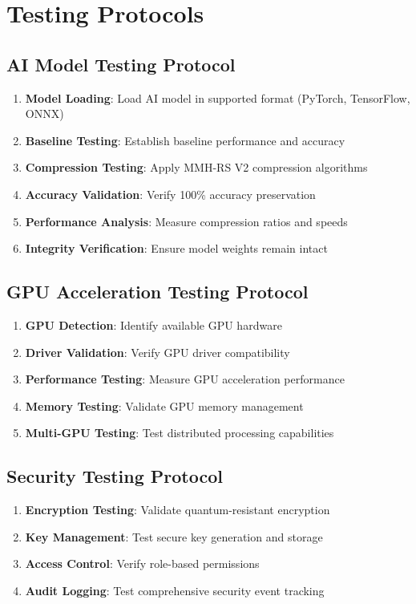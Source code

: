 \documentclass[12pt,a4paper]{article}
\begin{document}
\section{Testing Protocols}

\subsection{AI Model Testing Protocol}
\begin{enumerate}
    \item \textbf{Model Loading}: Load AI model in supported format (PyTorch, TensorFlow, ONNX)
    \item \textbf{Baseline Testing}: Establish baseline performance and accuracy
    \item \textbf{Compression Testing}: Apply MMH-RS V2 compression algorithms
    \item \textbf{Accuracy Validation}: Verify 100\% accuracy preservation
    \item \textbf{Performance Analysis}: Measure compression ratios and speeds
    \item \textbf{Integrity Verification}: Ensure model weights remain intact
\end{enumerate}

\subsection{GPU Acceleration Testing Protocol}
\begin{enumerate}
    \item \textbf{GPU Detection}: Identify available GPU hardware
    \item \textbf{Driver Validation}: Verify GPU driver compatibility
    \item \textbf{Performance Testing}: Measure GPU acceleration performance
    \item \textbf{Memory Testing}: Validate GPU memory management
    \item \textbf{Multi-GPU Testing}: Test distributed processing capabilities
\end{enumerate}

\subsection{Security Testing Protocol}
\begin{enumerate}
    \item \textbf{Encryption Testing}: Validate quantum-resistant encryption
    \item \textbf{Key Management}: Test secure key generation and storage
    \item \textbf{Access Control}: Verify role-based permissions
    \item \textbf{Audit Logging}: Test comprehensive security event tracking
\end{enumerate}
\end{document}
